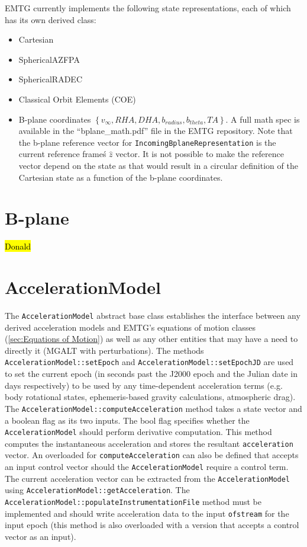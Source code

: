 EMTG currently implements the following state representations, each of which has its own derived class:
\begin{itemize}
	\item Cartesian
	\item SphericalAZFPA
	\item SphericalRADEC
	\item Classical Orbit Elements (COE)
	\item B-plane coordinates $\left\{v_\infty, RHA, DHA, b_{radius}, b_{theta}, TA\right\}$. A full math spec is available in the ``bplane\_math.pdf'' file in the EMTG repository. Note that the b-plane reference vector for \texttt{IncomingBplaneRepresentation} is the current reference frame\'s $\hat z$ vector. It is not possible to make the reference vector depend on the state as that would result in a circular definition of the Cartesian state as a function of the b-plane coordinates.
\end{itemize}

\section{B-plane}
\label{sec:bplane}

\hl{Donald}

\section{AccelerationModel}
\label{sec:acceleration_model}

The \texttt{AccelerationModel} abstract base class establishes the interface between any derived acceleration models and EMTG's equations of motion classes (\ref{sec:Equations of Motion}) as well as any other entities that may have a need to directly it (MGALT with perturbations). The methods \texttt{AccelerationModel::setEpoch} and \texttt{AccelerationModel::setEpochJD} are used to set the current epoch (in seconds past the J2000 epoch and the Julian date in days respectively) to be used by any time-dependent acceleration terms (e.g. body rotational states, ephemeris-based gravity calculations, atmospheric drag). The \texttt{AccelerationModel::computeAcceleration} method takes a state vector and a boolean flag as its two inputs. The bool flag specifies whether the \texttt{AccelerationModel} should perform derivative computation. This method computes the instantaneous acceleration and stores the resultant \texttt{acceleration} vector. An overloaded for \texttt{computeAcceleration} can also be defined that accepts an input control vector should the \texttt{AccelerationModel} require a control term. The current acceleration vector can be extracted from the \texttt{AccelerationModel} using \texttt{AccelerationModel::getAcceleration}. The \texttt{AccelerationModel::populateInstrumentationFile} method must be implemented and should write acceleration data to the input \texttt{ofstream} for the input epoch (this method is also overloaded with a version that accepts a control vector as an input). 

